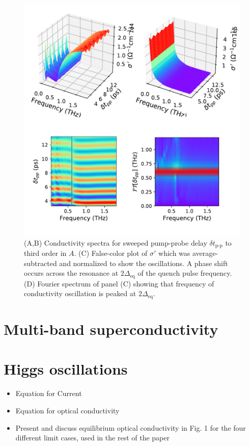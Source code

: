 \documentclass[aps,prb,reprint,noeprint,superscriptaddress]{revtex4-1}
\begin{document}
\begin{figure}[ht]
	\centering
	\includegraphics[width=\columnwidth]{figures/fig3.pdf}
	\caption{(A,B) Conductivity spectra for sweeped pump-probe delay $\delta
	t_{\text{p-p}}$ to third order in $A$. (C) False-color plot of
$\sigma' $ which was average-subtracted and normalized to show the oscillations.
A phase shift occurs across the resonance at $2\Delta_{\text{eq}}$ of the quench pulse
frequency. (D) Fourier spectrum of panel (C) showing that frequency of
conductivity oscillation is peaked at $2\Delta_{\text{eq}}$.}
\end{figure}
\section{Multi-band superconductivity}
\label{sec:multiband}
\section{Higgs oscillations}
\label{sec:higgs_oscillations}

\begin{itemize}
	\item Equation for Current
	\item Equation for optical conductivity
	\item Present and discuss equilibrium optical conductivity in Fig. 1 for the four different limit cases, used in the rest of the paper
\end{itemize}
\end{document}
